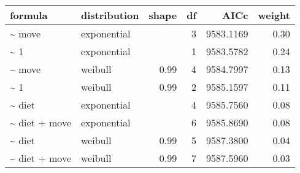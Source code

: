 \begin{table}[ht]
\centering
\begin{tabular}{llrrrr}
 formula & distribution & shape & df & AICc & weight \\ 
  \hline
\~{} move & exponential &  & 3 & 9583.1169 & 0.30 \\ 
  \~{} 1 & exponential &  & 1 & 9583.5782 & 0.24 \\ 
  \~{} move & weibull & 0.99 & 4 & 9584.7997 & 0.13 \\ 
  \~{} 1 & weibull & 0.99 & 2 & 9585.1597 & 0.11 \\ 
  \~{} diet & exponential &  & 4 & 9585.7560 & 0.08 \\ 
  \~{} diet + move & exponential &  & 6 & 9585.8690 & 0.08 \\ 
  \~{} diet & weibull & 0.99 & 5 & 9587.3800 & 0.04 \\ 
  \~{} diet + move & weibull & 0.99 & 7 & 9587.5960 & 0.03 \\ 
  \end{tabular}
\label{tab:na}
\end{table}
